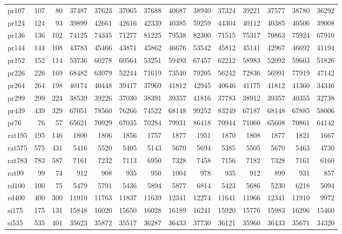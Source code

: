 {\begin{longtable}{l r r r r r r r r r r r r r}
pr107 & 107 & 80 & 37487 & 37623 & 37065 & 37688 & 40687 & 38940 & 37324 & 39221 & 37577 & 38780 & 36292 \\
pr124 & 124 & 93 & 39899 & 42661 & 42616 & 42339 & 40385 & 59259 & 44304 & 40112 & 40385 & 40506 & 39008 \\
pr136 & 136 & 102 & 74125 & 74345 & 71277 & 81225 & 79538 & 82300 & 71515 & 75317 & 70863 & 75924 & 67910 \\
pr144 & 144 & 108 & 43783 & 45466 & 43871 & 45862 & 46676 & 53542 & 45812 & 45141 & 42967 & 46692 & 41194 \\
pr152 & 152 & 114 & 53736 & 60278 & 60564 & 53251 & 59493 & 67457 & 62212 & 58983 & 52092 & 59603 & 51826 \\
pr226 & 226 & 169 & 68482 & 63079 & 52244 & 71619 & 73540 & 79205 & 56242 & 72836 & 56991 & 77919 & 47142 \\
pr264 & 264 & 198 & 40174 & 40448 & 39417 & 37969 & 41812 & 42945 & 40646 & 41175 & 41812 & 41360 & 34346 \\
pr299 & 299 & 224 & 38539 & 39226 & 37030 & 38391 & 39357 & 41816 & 37783 & 38912 & 39357 & 40355 & 32738 \\
pr439 & 439 & 329 & 67051 & 78560 & 76266 & 74522 & 68148 & 99252 & 83249 & 67187 & 68148 & 67885 & 58006 \\
pr76 & 76 & 57 & 65621 & 70929 & 67035 & 70284 & 79931 & 86418 & 70944 & 71060 & 65608 & 70861 & 64142 \\
rat195 & 195 & 146 & 1800 & 1806 & 1856 & 1757 & 1877 & 1951 & 1870 & 1808 & 1877 & 1821 & 1667 \\
rat575 & 575 & 431 & 5416 & 5520 & 5405 & 5143 & 5670 & 5694 & 5385 & 5505 & 5670 & 5463 & 4730 \\
rat783 & 783 & 587 & 7161 & 7232 & 7113 & 6950 & 7328 & 7458 & 7156 & 7182 & 7328 & 7161 & 6160 \\
rat99 & 99 & 74 & 912 & 908 & 935 & 950 & 1004 & 978 & 935 & 912 & 899 & 931 & 857 \\
rd100 & 100 & 75 & 5479 & 5791 & 5436 & 5894 & 5877 & 6814 & 5423 & 5686 & 5230 & 6218 & 5094 \\
rd400 & 400 & 300 & 11910 & 11763 & 11837 & 11639 & 12341 & 12274 & 11641 & 11966 & 12341 & 11910 & 9972 \\
si175 & 175 & 131 & 15848 & 16020 & 15650 & 16028 & 16189 & 16241 & 15920 & 15776 & 15983 & 16296 & 15460 \\
si535 & 535 & 401 & 35623 & 35872 & 35517 & 36287 & 36433 & 37730 & 36121 & 35960 & 36433 & 35671 & 34320 \\

\end{longtable}}

